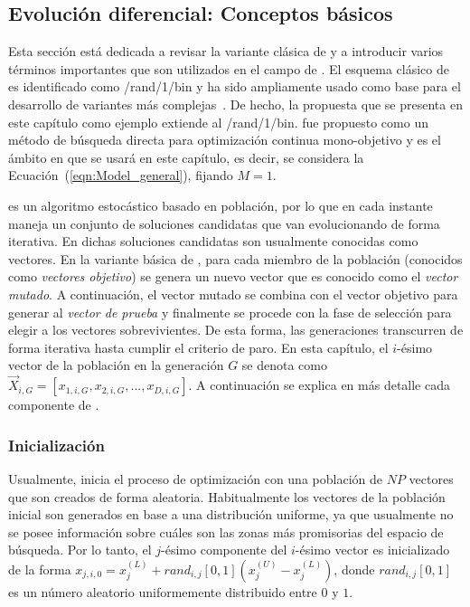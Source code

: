 \subsection{Evolución diferencial: Conceptos básicos}

Esta sección está dedicada a revisar la variante clásica de \DE{} y a introducir varios términos importantes que son utilizados 
en el campo de \DE{}.
%
El esquema clásico de \DE{} es identificado como \DE{}/rand/1/bin y ha sido ampliamente usado como base para el desarrollo de 
variantes más complejas~\cite{das2011differential}.
%
De hecho, la propuesta que se presenta en este capítulo como ejemplo extiende al \DE{}/rand/1/bin.
%
\DE{} fue propuesto como un método de búsqueda directa para optimización continua mono-objetivo y es el ámbito en que
se usará en este capítulo, es decir, se considera la Ecuación~(\ref{eqn:Model_general}), fijando $M = 1$.

\DE{} es un algoritmo estocástico basado en población, por lo que en cada instante maneja un conjunto de soluciones 
candidatas que van evolucionando de forma iterativa.
%
En \DE{} dichas soluciones candidatas son usualmente conocidas como vectores.
%
En la variante básica de \DE{}, para cada miembro de la población (conocidos como \textit{vectores objetivo}) 
se genera un nuevo vector que es conocido como el \textit{vector mutado}.
%
A continuación, el vector mutado se combina con el vector objetivo para generar al \textit{vector de prueba} y 
finalmente se procede con la fase de selección para elegir a los vectores sobrevivientes.
%
De esta forma, las generaciones transcurren de forma iterativa hasta cumplir el criterio de paro.
%
En esta capítulo, el $i$-ésimo vector de la población en la generación $G$ se denota como$\vec{X}_{i,G} = [x_{1,i,G}, x_{2,i,G},..., x_{D,i, G}]$.
%
A continuación se explica en más detalle cada componente de \DE{}.

\subsubsection{Inicialización}

Usualmente, \DE{} inicia el proceso de optimización con una población de $NP$ vectores que son creados de forma aleatoria.
%
Habitualmente los vectores de la población inicial son generados en base a una distribución uniforme, ya que usualmente no se posee 
información sobre cuáles son las zonas más promisorias del espacio de búsqueda.
%
Por lo tanto, el $j$-ésimo componente del $i$-ésimo vector es inicializado de la forma $x_{j,i,0} = x_{j}^{(L)} + rand_{i,j}[0,1] (x_{j}^{(U)} - x_{j}^{(L)})$,
donde $rand_{i,j}[0,1]$ es un número aleatorio uniformemente distribuido entre $0$ y $1$.

